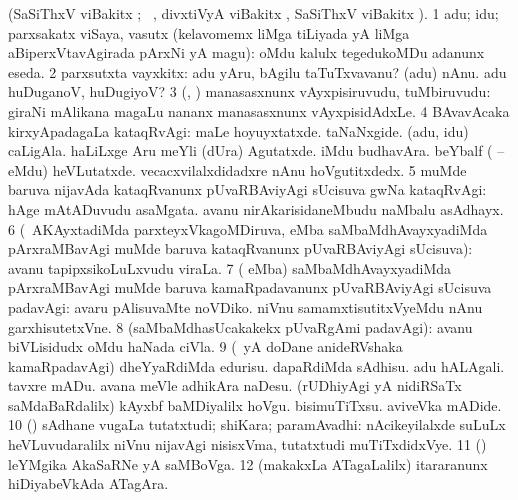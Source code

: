 \bentry
{}
\gl{\sanA}
\bmng
(SaSiThxV viBakitx ; \bava\ , divxtiVyA viBakitx , SaSiThxV viBakitx ). 
\bnum
\num{1} adu; idu; parxsakatx viSaya, vasutx (kelavomemx liMga tiLiyada yA liMga aBiperxVtavAgirada pArxNi yA magu):  oMdu kalulx tegedukoMDu adanunx eseda. 
\num{2} parxsutxta vayxkitx:  adu yAru, bAgilu taTuTxvavanu?  (adu) nAnu.  adu huDuganoV, huDugiyoV? 
\num{3} (\pArxparx, \kAparx) manasasxnunx vAyxpisiruvudu, tuMbiruvudu:  giraNi mAlikana magaLu nananx manasasxnunx vAyxpisidAdxLe. 
\num{4} BAvavAcaka kirxyApadagaLa kataqRvAgi:  maLe hoyuyxtatxde.  taNaNxgide.  (adu, idu) caLigAla.  haLiLxge Aru meYli (dUra) Agutatxde.  iMdu budhavAra.  beYbalf ( -- eMdu) heVLutatxde.  vecacxvilalxdidadxre nAnu hoVgutitxdedx. 
\num{5} muMde baruva nijavAda kataqRvanunx pUvaRBAviyAgi sUcisuva gwNa kataqRvAgi:  hAge mAtADuvudu asaMgata.  avanu nirAkarisidaneMbudu naMbalu asAdhayx. 
\num{6} (\kirxvi\ AKAyxtadiMda parxteyxVkagoMDiruva,  eMba saMbaMdhAvayxyadiMda pArxraMBavAgi muMde baruva kataqRvanunx pUvaRBAviyAgi sUcisuva):  avanu tapipxsikoLuLxvudu viraLa. 
\num{7} ( eMba) saMbaMdhAvayxyadiMda pArxraMBavAgi muMde baruva kamaRpadavanunx pUvaRBAviyAgi sUcisuva padavAgi:  avaru pAlisuvaMte noVDiko.  niVnu samamxtisutitxVyeMdu nAnu garxhisutetxVne. 
\num{8} (saMbaMdhasUcakakekx pUvaRgAmi padavAgi):  avanu biVLisidudx oMdu haNada ciVla. 
\num{9} (\sakirx\ yA \akirx doDane anideRVshaka kamaRpadavAgi)  dheYyaRdiMda edurisu.  dapaRdiMda sAdhisu.  adu hALAgali.  tavxre mADu.  avana meVle adhikAra naDesu.  (rUDhiyAgi yA nidiRSaTx saMdaBaRdalilx) kAyxbf baMDiyalilx hoVgu.  bisimuTiTxsu.  aviveVka mADide. 
\num{10} (\AmA) sAdhane \mo vugaLa tutatxtudi; shiKara; paramAvadhi:  nAcikeyilalxde suLuLx heVLuvudaralilx niVnu nijavAgi nisisxVma, tutatxtudi muTiTxdidxVye. 
\num{11} (\AmA) leYMgika AkaSaRNe yA saMBoVga. 
\num{12} (makakxLa ATagaLalilx) itararanunx hiDiyabeVkAda ATagAra. 
\enum
\emng

